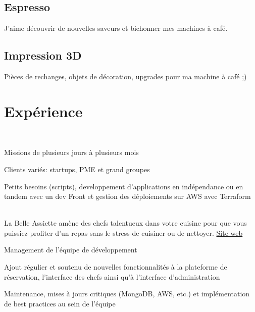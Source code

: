 \documentclass[
  french,
  a4paper
]{resume-openfont}
\begin{document}
\begin{minipage}[t]{0.31\textwidth}
\subsection{Espresso}
J'aime découvrir de nouvelles saveurs et bichonner mes machines à café.
\sectionsep

\subsection{Impression 3D}
Pièces de rechanges, objets de décoration, upgrades pour ma machine à café ;)

%
%
\end{minipage}%
\hfill%
\begin{minipage}[t]{0.66\textwidth}


\section{Expérience}

%
%
\\
\vspace{0.5\topsep}
\begin{tightemize}
\item Missions de plusieurs jours à plusieurs mois
\item Clients variés: startups, PME et grand groupes
\item Petits besoins (scripts), developpement d'applications en indépendance ou en tandem avec un dev Front et gestion des déploiements sur AWS avec Terraform
\end{tightemize}
\sectionsep

%
%
\\
La Belle Assiette amène des chefs talentueux dans votre cuisine pour que vous puissiez profiter d'un repas sans le stress de cuisiner ou de nettoyer. \href{https://labelleassiette.fr}{Site web}
\vspace{\topsep}
\begin{tightemize}
\item Management de l'équipe de développement
\item Ajout régulier et soutenu de nouvelles fonctionnalités à la plateforme de réservation, l'interface des chefs ainsi qu'à l'interface d'administration
\item Maintenance, mises à jours critiques (MongoDB, AWS, etc.) et implémentation de best practices au sein de l'équipe
\end{tightemize}
\sectionsep


\end{minipage}
\end{document}
